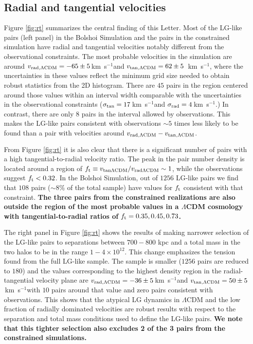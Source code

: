 \documentclass{emulateapj}
\newcommand{\kms}{\,km~s$^{-1}$}
\newcommand{\Msun}{{\ifmmode{{\rm {M_{\odot}}}}\else{${\rm{M_{\odot}}}$}\fi}}
\begin{document}
\subsection{Radial and tangential velocities}

Figure \ref{fig:rt} summarizes the central finding of this Letter. Most of the LG-like pairs (left panel) in the Bolshoi Simulation and the pairs in the constrained simulation have radial and tangential velocities notably different from the observational constraints.  The most probable velocities in the simulation are around $v_{\rm rad,\Lambda CDM} = -65\pm5$\kms and $v_{\rm tan,\Lambda CDM} = 62\pm5$ \kms, where the uncertainties in these values reflect the minimum grid size needed to obtain robust statistics from the 2D histogram. There are $45$ pairs in the region centered around those values within an interval width comparable with the uncertainties in the observational constraints ($\sigma_{\rm tan}=17$\kms and $\sigma_{\rm rad}=4$\kms.) In contrast, there are only $8$ pairs in the interval allowed by observations. This makes the LG-like pairs consistent with observations $\sim5$ times less likely to be found than a pair with velocities around $v_{\rm rad,\Lambda CDM}-v_{\rm tan,\Lambda CDM}$.

From Figure \ref{fig:rt} it is also clear that there is a significant number of pairs with a high tangential-to-radial velocity ratio. The peak in the pair number density is located around a region of $f_{\rm t}\equiv v_{\rm tan \Lambda CDM}/v_{\rm rad \Lambda CDM}\sim 1$, while the observations suggest $f_{\rm t}<0.32$. In the Bolshoi Simulation, out of $1256$ LG-like pairs we find that $108$ pairs ($\sim 8\%$ of the total sample) have values for $f_{\rm t}$ consistent with that constraint. {\bf The three pairs from the constrained realizations are also outside the region of the most probable values in a $\Lambda$CDM cosmology with tangential-to-radial ratios of $f_{\rm t}= 0.35, 0.45, 0.73$.}

The right panel in Figure \ref{fig:rt} shows the results of making narrower selection of the LG-like pairs to separations between $700-800$ kpc and a total mass in the two halos to be in the range $1-4 \times 10^{12}$\Msun. This change emphasizes the tension found from the full LG-like sample. The sample is smaller ($1256$ pairs are reduced to $180$) and the values corresponding to the highest density region in the radial-tangential velocity plane are  $v_{\rm rad,\Lambda CDM} = -36\pm 5$\kms and $v_{\rm tan,\Lambda CDM} = 50\pm5$\kms with $10$ pairs around that value and zero pairs consistent with observations. This shows that the atypical LG dynamics in $\Lambda$CDM and the low fraction of radially dominated velocities are robust results with respect to the separation and total mass conditions used to define the LG-like pairs. {\bf We note that this tighter selection also excludes 2 of the 3 pairs from the constrained simulations.}
\end{document}
